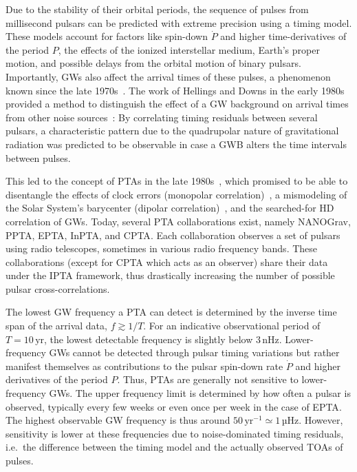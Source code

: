 Due to the stability of their orbital periods, the sequence of pulses from millisecond pulsars can be predicted with extreme precision using a timing model. These models account for factors like spin-down $\dot{P}$ and higher time-derivatives of the period $P$, the effects of the ionized interstellar medium, Earth's proper motion, and possible delays from the orbital motion of binary pulsars. Importantly, \acp{GW} also affect the arrival times of these pulses, a phenomenon known since the late 1970s~\cite{Sazhin:1978myk, Detweiler:1979wn}. The  work of Hellings and Downs in the early 1980s provided a method to distinguish the effect of a \ac{GW} background on arrival times from other noise sources~\cite{Hellings:1983fr}: By correlating timing residuals between several pulsars, a characteristic pattern due to the quadrupolar nature of gravitational radiation was predicted to be observable in case a \ac{GWB} alters the time intervals between pulses.

This led to the concept of \acp{PTA} in the late 1980s~\cite{Foster:1990}, which promised to be able to disentangle the effects of clock errors (monopolar correlation)~\cite{Hobbs:2019ktp}, a mismodeling of the Solar System's barycenter (dipolar correlation)~\cite{Caballero:2018lvc}, and the searched-for \ac{HD} correlation of \acp{GW}.  Today, several \ac{PTA} collaborations exist, namely \acs{NANOGrav}, \acs{PPTA}, \acs{EPTA}, \acs{InPTA}, and \acs{CPTA}. Each collaboration observes a set of pulsars using radio telescopes, sometimes in various radio frequency bands. These collaborations (except for \acs{CPTA} which acts as an observer) share their data under the \ac{IPTA} framework, thus drastically increasing the number of possible pulsar cross-correlations.

The lowest \ac{GW} frequency a \ac{PTA} can detect is determined by the inverse time span of the arrival data, $f \gtrsim 1 / T$. For an indicative observational period of $T = 10 \, \text{yr}$, the lowest detectable frequency is slightly below $3 \, \text{nHz}$. Lower-frequency \acp{GW} cannot be detected through pulsar timing variations but rather manifest themselves as contributions to the pulsar spin-down rate $\dot{P}$ and higher derivatives  of the period $P$. Thus, \acp{PTA} are generally not sensitive to lower-frequency \acp{GW}. The upper frequency limit is determined by how often a pulsar is observed, typically every few weeks or even once per week in the case of \acs{EPTA}. The highest observable \ac{GW} frequency is thus around $50 \,  \text{yr}^{-1} \simeq 1 \, \text{µHz}$. However, sensitivity is lower at these frequencies due to noise-dominated timing residuals, i.e.~the difference between the timing model and the actually observed \acp{TOA} of pulses.

